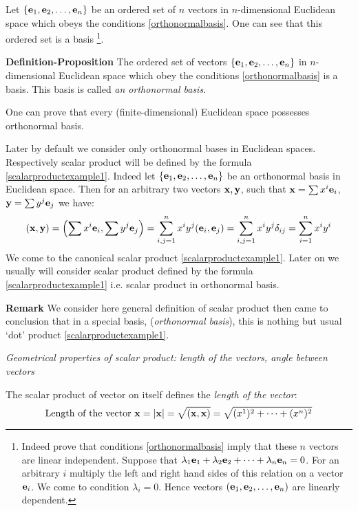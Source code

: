 \documentclass[12pt]{article}
\numberwithin{equation}{section}
\begin{document}
   Let  $\{{\bf e}_1,{\bf e}_2,\dots,{\bf e}_n\}$ be an ordered set of $n$ vectors in $n$-dimensional
   Euclidean space which obeys the conditions
 \eqref{orthonormalbasis}. One can see that this ordered set is a basis
 \footnote
 {Indeed prove that conditions \eqref{orthonormalbasis} imply that these $n$ vectors are linear independent.
 Suppose that $\lambda_1{\bf e}_1+\lambda_2{\bf e}_2+\dots+\lambda_n{\bf e}_n=0$.
 For an arbitrary $i$ multiply the left and right hand sides of this relation on
 a vector ${\bf e}_i$. We come to condition $\lambda_i=0$.
 Hence vectors $({\bf e}_1,{\bf e}_2,\dots,{\bf e}_n)$ are linearly dependent.}.

{\bf Definition-Proposition}   The ordered set of vectors
$\{{\bf e}_1,{\bf e}_2,\dots,{\bf e}_n\}$ in $n$-dimensional Euclidean space which obey the conditions
 \eqref{orthonormalbasis} is a basis.  This basis  is called {\it an orthonormal basis}.



\smallskip

 One can prove that every (finite-dimensional)  Euclidean
 space possesses orthonormal basis.

 Later by default we consider only orthonormal bases in Euclidean spaces.
 Respectively scalar product will be defined by the formula \eqref{scalarproductexample1}.
 Indeed let $\{{\bf e}_1,{\bf e}_2,\dots,{\bf e}_n\}$ be an orthonormal basis in Euclidean space. Then for an arbitrary two vectors
 ${\bf x},{\bf y}$, such that ${\bf x}=\sum x^i{{\bf e}_i}$, ${\bf y}=\sum y^j{{\bf e}_j}$ we have:
    \begin{equation*}\label{scalarproduct4}
    ({\bf x},{\bf y})=\left(\sum x^i{{\bf e}_i},\sum y^j{{\bf e}_j}\right)=
    \sum_{i,j=1}^nx^iy^j({\bf e}_i,{\bf e}_j)=\sum_{i,j=1}^nx^iy^j\delta_{ij}=
    \sum_{i=1}^nx^iy^i
\end{equation*}
 We come to the canonical  scalar product \eqref{scalarproductexample1}.
Later on we usually will consider scalar product defined by the formula
  \eqref{scalarproductexample1} 
i.e. scalar product in orthonormal basis.

\smallskip

{\bf Remark} We consider here general definition of scalar product
then came  to conclusion that in a special basis, 
({\it orthonormal basis}),
this is nothing but usual `dot' product 
\eqref{scalarproductexample1}. 

\smallskip


 \centerline {\it Geometrical properties of scalar product: length of the vectors, angle between vectors}

The scalar product of vector on itself defines the  {\it length of the vector}:
\begin{equation}\label{length}
\hbox {Length of the vector ${\bf x}$}=|{\bf x}|=\sqrt {({\bf x},{\bf x})}=\sqrt {(x^1)^2+\dots+(x^n)^2}
\end{equation}
\end{document}
